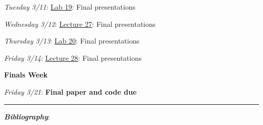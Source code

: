 \documentclass[12pt]{article}
\begin{document}
\emph{Tuesday 3/11}: \underline{Lab 19}: Final presentations

\emph{Wednesday 3/12}: \underline{Lecture 27}: Final presentations

\emph{Thursday 3/13}: \underline{Lab 20}: Final presentations

\emph{Friday 3/14}: \underline{Lecture 28}: Final presentations

\noindent\textbf{Finals Week}

\emph{Friday 3/21}: \textbf{Final paper and code due}

\begin{center}
  \rule{\textwidth}{0.5pt}
\end{center}
\nocite{*}

\noindent\textbf{\emph{Bibliography}}:\\
\printbibliography[heading=none]
\end{document}
